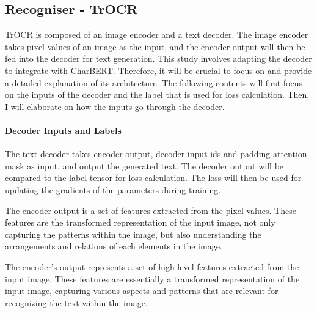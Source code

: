 \subsection{Recogniser - TrOCR}
\label{subsec:3_recogniser_trocr}
TrOCR is composed of an image encoder and a text decoder. The image encoder takes pixel values of an image as the input, and the encoder output will then be fed into the decoder for text generation. This study involves adapting the decoder to integrate with CharBERT.  Therefore, it will be crucial to focus on and provide a detailed explanation of its architecture. The following contents will first focus on the inputs of the decoder and the label that is used for loss calculation. Then, I will elaborate on how the inputs go through the decoder.

\paragraph*{Decoder Inputs and Labels}
\label{par:3_decoder_inputs_and_labels}
The text decoder takes encoder output, decoder input ids and padding attention mask as input, and output the generated text. The decoder output will be compared to the label tensor for loss calculation. The loss will then be used for updating the gradients of the parameters during training.

The encoder output is a set of features extracted from the pixel values. These features are the transformed representation of the input image, not only capturing the patterns within the image, but also understanding the arrangements and relations of each elements in the image.

The encoder's output represents a set of high-level features extracted from the input image. These features are essentially a transformed representation of the input image, capturing various aspects and patterns that are relevant for recognizing the text within the image.

